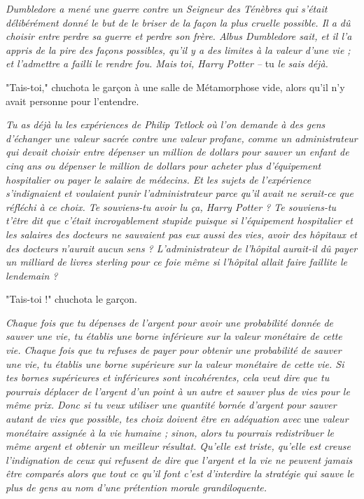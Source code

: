 \emph{Dumbledore a mené une guerre contre un Seigneur des Ténèbres qui s'était délibérément donné le but de le briser de la façon la plus cruelle possible. Il a dû choisir entre perdre sa guerre et perdre son frère. Albus Dumbledore sait, et il l'a appris de la pire des façons possibles, qu'il y a des limites à la valeur d'une vie ; et l'admettre a failli le rendre fou. Mais toi, Harry Potter – } tu\emph{ le sais déjà.} 

"Tais-toi," chuchota le garçon à une salle de Métamorphose vide, alors qu'il n'y avait personne pour l'entendre.

\emph{Tu as déjà lu les expériences de Philip Tetlock où l'on demande à des gens d'échanger une valeur sacrée contre une valeur profane, comme un administrateur qui devait choisir entre dépenser un million de dollars pour sauver un enfant de cinq ans ou dépenser le million de dollars pour acheter plus d'équipement hospitalier ou payer le salaire de médecins. Et les sujets de l'expérience s'indignaient et voulaient punir l'administrateur parce qu'il avait ne serait-ce que réfléchi à ce choix. Te souviens-tu avoir lu ça, Harry Potter ? Te souviens-tu t'être dit que c'était incroyablement stupide puisque si l'équipement hospitalier et les salaires des docteurs ne sauvaient pas eux aussi des vies, avoir des hôpitaux et des docteurs n'aurait aucun sens ? L'administrateur de l'hôpital aurait-il dû payer un milliard de livres sterling pour ce foie même si l'hôpital allait faire faillite le lendemain ?} 

"Tais-toi !" chuchota le garçon.

\emph{Chaque fois que tu dépenses de l'argent pour avoir une probabilité donnée de sauver une vie, tu établis une borne inférieure sur la valeur monétaire de cette vie. Chaque fois que tu refuses de payer pour obtenir une probabilité de sauver une vie, tu établis une borne supérieure sur la valeur monétaire de cette vie. Si tes bornes supérieures et inférieures sont incohérentes, cela veut dire que tu pourrais déplacer de l'argent d'un point à un autre et sauver plus de vies pour le même prix. Donc si tu veux utiliser une quantité bornée d'argent pour sauver autant de vies que possible, tes choix doivent être en adéquation avec } une\emph{ valeur monétaire assignée à la vie humaine ; sinon, alors tu pourrais redistribuer le même argent et obtenir un meilleur résultat. Qu'elle est triste, qu'elle est creuse l'indignation de ceux qui refusent de dire que l'argent et la vie ne peuvent jamais être comparés alors que tout ce qu'il font c'est d'interdire la stratégie qui sauve le plus de gens au nom d'une prétention morale grandiloquente.} 

